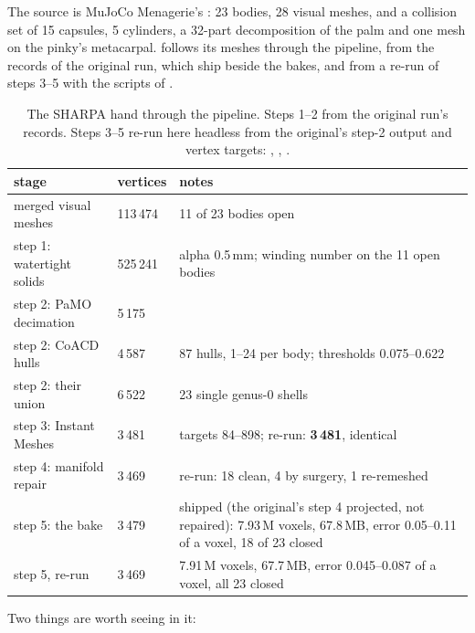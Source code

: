 The source is MuJoCo Menagerie's : 23 bodies, 28 visual meshes, and a collision set of 15 capsules, 5 cylinders, a 32-part decomposition of the palm and one mesh on the pinky's metacarpal.  follows its meshes through the pipeline, from the records of the original run, which ship beside the bakes, and from a re-run of steps 3--5 with the scripts of .

\begin{table}[t]
\centering
\caption{The SHARPA hand through the pipeline. Steps 1--2 from the original run's records. Steps 3--5 re-run here headless from the original's step-2 output and vertex targets: , , .}
\label{tab:exmesh}
\small
\begin{tabularx}{\linewidth}{@{}L{48mm}R{18mm}Y@{}}
\toprule
stage & vertices & notes \\
\midrule
merged visual meshes & 113\,474 & 11 of 23 bodies open \\
step 1: watertight solids & 525\,241 & alpha 0.5\,mm; winding number on the 11 open bodies \\
step 2: PaMO decimation & 5\,175 & \\
step 2: CoACD hulls & 4\,587 & 87 hulls, 1--24 per body; thresholds 0.075--0.622 \\
step 2: their union & 6\,522 & 23 single genus-0 shells \\
step 3: Instant Meshes & 3\,481 & targets 84--898; re-run: \textbf{3\,481}, identical \\
step 4: manifold repair & 3\,469 & re-run: 18 clean, 4 by surgery, 1 re-remeshed \\
step 5: the bake & 3\,479 & shipped (the original's step 4 projected, not repaired): 7.93\,M voxels, 67.8\,MB, error 0.05--0.11 of a voxel, 18 of 23 closed \\
step 5, re-run & 3\,469 & 7.91\,M voxels, 67.7\,MB, error 0.045--0.087 of a voxel, all 23 closed \\
\bottomrule
\end{tabularx}
\end{table}

Two things are worth seeing in it:

